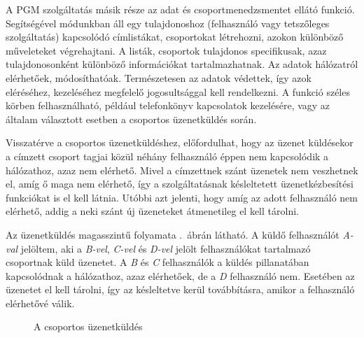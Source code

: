 A PGM szolgáltatás másik része az adat és csoportmenedzsmentet ellátó funkció. Segítségével módunkban áll egy tulajdonoshoz (felhasználó vagy tetszőleges szolgáltatás) kapcsolódó címlistákat, csoportokat létrehozni, azokon különböző műveleteket végrehajtani. A listák, csoportok tulajdonos specifikusak, azaz tulajdonosonként különböző információkat tartalmazhatnak. Az adatok hálózatról elérhetőek, módosíthatóak. Természetesen az adatok védettek, így azok eléréséhez, kezeléséhez megfelelő jogosultsággal kell rendelkezni. A funkció széles körben felhasználható, például telefonkönyv kapcsolatok kezelésére, vagy az általam választott esetben a csoportos üzenetküldés során. 

Visszatérve a csoportos üzenetküldéshez, előfordulhat, hogy az üzenet küldésekor a címzett csoport tagjai közül néhány felhasználó éppen nem kapcsolódik a hálózathoz, azaz nem elérhető. Mivel a címzettnek szánt üzenetek nem veszhetnek el, amíg ő maga nem elérhető, így a szolgáltatásnak késleltetett üzenetkézbesítési funkciókat is el kell látnia. Utóbbi azt jelenti, hogy amíg az adott felhasználó nem elérhető, addig a neki szánt új üzeneteket átmenetileg el kell tárolni.

Az üzenetküldés magasszintű folyamata .~ábrán látható. A küldő felhasználót \emph{A-val} jelöltem, aki a \emph{B-vel}, \emph{C-vel} és \emph{D-vel} jelölt felhasználókat tartalmazó csoportnak küld üzenetet. A \emph{B} és \emph{C} felhasználók a küldés pillanatában kapcsolódnak a hálózathoz, azaz elérhetőek, de a \emph{D} felhasználó nem. Esetében az üzenetet el kell tárolni, így az késleltetve kerül továbbításra, amikor a felhasználó elérhetővé válik.

\begin{figure}[htbp]
\center
{}
\caption{A csoportos üzenetküldés}
\label{fig:group_messaging}
\end{figure}

